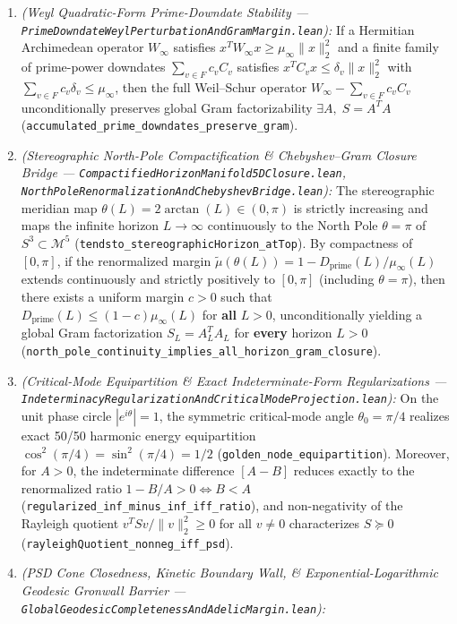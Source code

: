 \documentclass[
  11pt,
]{article}
\providecommand{\tightlist}{%
  \setlength{\itemsep}{0pt}\setlength{\parskip}{0pt}}
\begin{document}
\begin{enumerate}
\def\labelenumi{\arabic{enumi}.}
\tightlist
\item
  \emph{(Weyl Quadratic-Form Prime-Downdate Stability ---
  \texttt{PrimeDowndateWeylPerturbationAndGramMargin.lean}):} If a
  Hermitian Archimedean operator \(W_\infty\) satisfies
  \(x^T W_\infty x \ge \mu_\infty \|x\|_2^2\) and a finite family of
  prime-power downdates \(\sum_{v \in F} c_v C_v\) satisfies
  \(x^T C_v x \le \delta_v \|x\|_2^2\) with
  \(\sum_{v \in F} c_v \delta_v \le \mu_\infty\), then the full
  Weil--Schur operator \(W_\infty - \sum_{v \in F} c_v C_v\)
  unconditionally preserves global Gram factorizability
  \(\exists A,\; S = A^T A\)
  (\texttt{accumulated\_prime\_downdates\_preserve\_gram}).
\item
  \emph{(Stereographic North-Pole Compactification \& Chebyshev--Gram
  Closure Bridge --- \texttt{CompactifiedHorizonManifold5DClosure.lean},
  \texttt{NorthPoleRenormalizationAndChebyshevBridge.lean}):} The
  stereographic meridian map \(\theta(L) = 2\arctan(L) \in (0, \pi)\) is
  strictly increasing and maps the infinite horizon \(L \to \infty\)
  continuously to the North Pole \(\theta = \pi\) of
  \(S^3 \subset \mathcal{M}^5\)
  (\texttt{tendsto\_stereographicHorizon\_atTop}). By compactness of
  \([0, \pi]\), if the renormalized margin
  \(\tilde{\mu}(\theta(L)) = 1 - D_{\text{prime}}(L)/\mu_\infty(L)\)
  extends continuously and strictly positively to \([0, \pi]\)
  (including \(\theta = \pi\)), then there exists a uniform margin
  \(c > 0\) such that \(D_{\text{prime}}(L) \le (1 - c)\mu_\infty(L)\)
  for \textbf{all} \(L > 0\), unconditionally yielding a global Gram
  factorization \(S_L = A_L^T A_L\) for \textbf{every} horizon \(L > 0\)
  (\texttt{north\_pole\_continuity\_implies\_all\_horizon\_gram\_closure}).
\item
  \emph{(Critical-Mode Equipartition \& Exact Indeterminate-Form
  Regularizations ---
  \texttt{IndeterminacyRegularizationAndCriticalModeProjection.lean}):}
  On the unit phase circle \(|e^{i\theta}| = 1\), the symmetric
  critical-mode angle \(\theta_0 = \pi/4\) realizes exact 50/50 harmonic
  energy equipartition \(\cos^2(\pi/4) = \sin^2(\pi/4) = 1/2\)
  (\texttt{golden\_node\_equipartition}). Moreover, for \(A > 0\), the
  indeterminate difference \([A - B]\) reduces exactly to the
  renormalized ratio \(1 - B/A > 0 \iff B < A\)
  (\texttt{regularized\_inf\_minus\_inf\_iff\_ratio}), and
  non-negativity of the Rayleigh quotient \(v^T S v / \|v\|_2^2 \ge 0\)
  for all \(v \neq 0\) characterizes \(S \succeq 0\)
  (\texttt{rayleighQuotient\_nonneg\_iff\_psd}).
\item
  \emph{(PSD Cone Closedness, Kinetic Boundary Wall, \&
  Exponential-Logarithmic Geodesic Gronwall Barrier ---
  \texttt{GlobalGeodesicCompletenessAndAdelicMargin.lean}):}


\end{enumerate}
\end{document}
